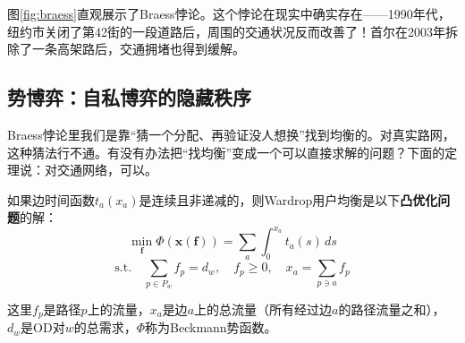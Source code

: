 图\ref{fig:braess}直观展示了Braess悖论。这个悖论在现实中确实存在——1990年代，纽约市关闭了第42街的一段道路后，周围的交通状况反而改善了！首尔在2003年拆除了一条高架路后，交通拥堵也得到缓解。

\subsection{势博弈：自私博弈的隐藏秩序}

Braess悖论里我们是靠“猜一个分配、再验证没人想换”找到均衡的。对真实路网，这种猜法行不通。有没有办法把“找均衡”变成一个可以直接求解的问题？下面的定理说：对交通网络，可以。

\begin{theorem}[Beckmann势函数]
如果边时间函数$t_a(x_a)$是连续且非递减的，则Wardrop用户均衡是以下\textbf{凸优化问题}的解：
\begin{equation}
    \min_{\mathbf{f}} \Phi(\mathbf{x}(\mathbf{f})) = \sum_{a} \int_0^{x_a} t_a(s) \, ds
\end{equation}
\begin{equation}
    \text{s.t.} \quad \sum_{p \in P_w} f_p = d_w, \quad f_p \geq 0, \quad x_a = \sum_{p \ni a} f_p
\end{equation}

这里$f_p$是路径$p$上的流量，$x_a$是边$a$上的总流量（所有经过边$a$的路径流量之和），$d_w$是OD对$w$的总需求，$\Phi$称为Beckmann势函数。
\end{theorem}


